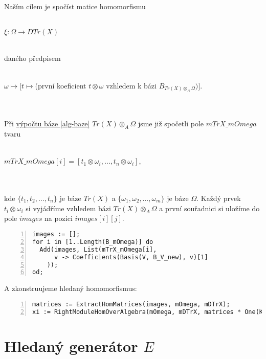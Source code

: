       \paragraph{ } Naším cílem je spočíst matice homomorfismu \\\\
      \centerline{$\xi: \Omega\rightarrow DTr(X)$} \\
      daného předpisem \\ \\
      \centerline{$\omega\mapsto [t\mapsto$(první koeficient
       $t\otimes\omega$ vzhledem k bázi $B_{Tr(X)\otimes_A \Omega})]$.}\\\\
       Při \hyperref[alg-baze]{výpočtu báze \ref*{alg-baze}} $Tr(X)\otimes_A \Omega$ 
       jsme  již spočetli pole $mTrX\_mOmega$ tvaru \\\\
       \centerline{$mTrX\_mOmega[i]=[t_1\otimes\omega_i,\ldots,t_n\otimes\omega_i]$,} \\\\ 
       kde
       $\{t_1,t_2,\ldots,t_n\}$ je báze $Tr(X)$ a $\{\omega_1,\omega_2,\ldots,\omega_m\}$ 
       je báze $\Omega$. Každý prvek $t_i\otimes\omega_i$ si vyjádříme vzhledem bázi 
       $Tr(X)\otimes_A \Omega$ a první souřadnici si uložíme do pole $images$ na pozici 
       $images[i][j]$.

      \begin{Verbatim}[frame=single,numbers=left]
images := [];
for i in [1..Length(B_mOmega)] do
  Add(images, List(mTrX_mOmega[i], 
      v -> Coefficients(Basis(V, B_V_new), v)[1] 
    ));
od;
      \end{Verbatim}             
A zkonstruujeme hledaný homomorfismus:       
       
      \begin{Verbatim}[frame=single,numbers=left]
matrices := ExtractHomMatrices(images, mOmega, mDTrX);
xi := RightModuleHomOverAlgebra(mOmega, mDTrX, matrices * One(K));
      \end{Verbatim}
    
  \section{Hledaný generátor $E$}
  
